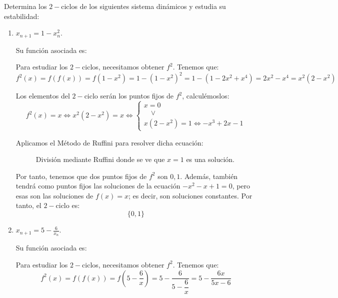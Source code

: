 \begin{ejercicio}
    Determina los $2-$ciclos de los siguientes sistema dinámicos y estudia su estabilidad:
    \begin{enumerate}
        \item $x_{n+1}=1-x_n^2$.

        Su función asociada es:

        Para estudiar los $2-$ciclos, necesitamos obtener $f^2$. Tenemos que:
        \begin{equation*}
            f^2(x)=f(f(x)) = f(1-x^2) = 1-(1-x^2)^2 = 1-(1-2x^2+x^4)
            = 2x^2-x^4 = x^2(2-x^2)
        \end{equation*}

        Los elementos del $2-$ciclo serán los puntos fijos de $f^2$, calculémoslos:
        \begin{equation*}
            f^2(x)=x \Longleftrightarrow x^2(2-x^2) = x \Longleftrightarrow \left\{
            \begin{array}{l}
                x = 0\\
                \quad \lor \\
                x(2-x^2)=1 \Longleftrightarrow -x^3+2x-1
            \end{array}\right.
        \end{equation*}

        Aplicamos el Método de Ruffini para resolver dicha ecuación:
        \begin{figure}[H]
            \centering
            \caption{División mediante Ruffini donde se ve que $x=1$ es una solución.}
        \end{figure}

        Por tanto, tenemos que dos puntos fijos de $f^2$ son $0, 1$. Además, también tendrá como puntos fijos las soluciones de la ecuación $-x^2-x+1=0$, pero esas son las soluciones de $f(x)=x$; es decir, son soluciones constantes. Por tanto, el $2-$ciclo es:
        \begin{equation*}
            \{0, 1\}
        \end{equation*}
        
        \item $x_{n+1}=5-\frac{6}{x_n}$.

        Su función asociada es:

        Para estudiar los $2-$ciclos, necesitamos obtener $f^2$. Tenemos que:
        \begin{equation*}
            f^2(x)=f(f(x)) = f\left(5-\dfrac{6}{x}\right) = 5-\dfrac{6}{5-\dfrac{6}{x}}
            = 5-\dfrac{6x}{5x-6}
        \end{equation*}


\end{enumerate}
\end{ejercicio}
